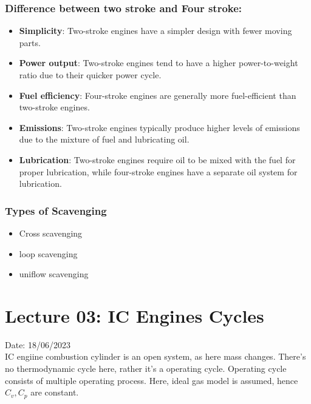 \documentclass{article}
\begin{document}
 \subsubsection*{Difference between two stroke and Four stroke:}
 \begin{itemize}
	\item \textbf{Simplicity}: Two-stroke engines have a simpler design with fewer moving parts.
	\item \textbf{Power output}: Two-stroke engines tend to have a higher power-to-weight ratio due to their quicker power cycle.
	\item \textbf{Fuel efficiency}: Four-stroke engines are generally more fuel-efficient than two-stroke engines.
	\item \textbf{Emissions}: Two-stroke engines typically produce higher levels of emissions due to the mixture of fuel and lubricating oil.
	\item \textbf{Lubrication}: Two-stroke engines require oil to be mixed with the fuel for proper lubrication, while four-stroke engines have a separate oil system for lubrication.
 \end{itemize}

 \subsubsection*{Types of Scavenging}
 \begin{itemize}
	\item Cross scavenging 
	\item loop scavenging 
	\item uniflow scavenging 
 \end{itemize}

 \section{Lecture 03: IC Engines Cycles} 
\hfill Date: 18/06/2023 \\ 
IC engiine combustion cylinder is an open system, as here mass changes. There's no thermodynamic cycle here, rather it's a operating cycle. Operating cycle consists of multiple operating process. Here, ideal gas model is assumed, hence $C_v,C_p$ are constant. 
\end{document}
